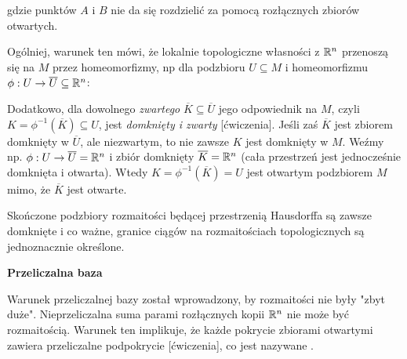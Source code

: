 gdzie punktów $A$ i $B$ nie da się rozdzielić za pomocą rozłącznych zbiorów otwartych.

Ogólniej, warunek ten mówi, że lokalnie topologiczne własności z $\mathbb{R}^n$ przenoszą się na $M$ przez homeomorfizmy, np dla podzbioru $U\subseteq M$ i homeomorfizmu $\phi:U\to\overline{U}\subseteq\mathbb{R}^n$:

\begin{center}
\end{center}

Dodatkowo, dla dowolnego \emph{zwartego} $\overline K\subseteq\overline{U}$ jego odpowiednik na $M$, czyli $K=\phi^{-1}(\overline{K})\subseteq U$, jest \emph{domknięty i zwarty} [ćwiczenia]. Jeśli zaś $\overline{K}$ jest zbiorem domknięty w $\overline{U}$, ale niezwartym, to nie zawsze $K$ jest domknięty w $M$. Weźmy np. $\phi:U\to\overline{U}=\mathbb{R}^n$ i zbiór domknięty $\overline{K}=\mathbb{R}^n$ (cała przestrzeń jest jednocześnie domknięta i otwarta). Wtedy $K=\phi^{-1}(\overline{K})=U$ jest otwartym podzbiorem  $M$ mimo, że $\overline{K}$ jest otwarte.

Skończone podzbiory rozmaitości będącej przestrzenią Hausdorffa są zawsze domknięte i co ważne, granice ciągów na rozmaitościach topologicznych są jednoznacznie określone.
\medskip

\textbf{Przeliczalna baza}

Warunek przeliczalnej bazy został wprowadzony, by rozmaitości nie były "zbyt duże". Nieprzeliczalna suma parami rozłącznych kopii $\mathbb{R}^n$ nie może być rozmaitością. Warunek ten implikuje, że każde pokrycie zbiorami otwartymi zawiera przeliczalne podpokrycie [ćwiczenia], co jest nazywane .

